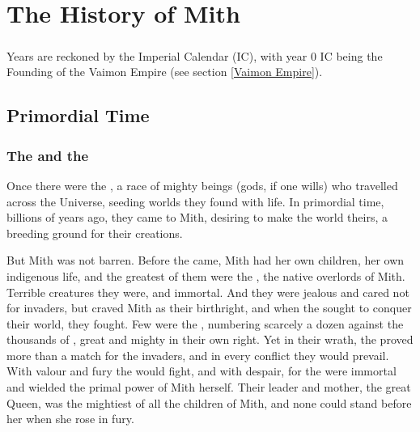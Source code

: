 \chapter{The History of Mith}




%







\paragraph{} Years are reckoned by the Imperial Calendar (IC), with year 0 IC being the Founding of the Vaimon Empire (see section \ref{Vaimon Empire}). 



\section{Primordial Time}
\subsection{The \voyagers{} and the \krakens{}}
\index{\krakens}
\label{Kraken}
\index{\voyagers}
\label{Voyagers}
Once there were the \voyagers, a race of mighty beings (gods, if one wills) who travelled across the Universe, seeding worlds they found with life. In primordial time, billions of years ago, they came to Mith, desiring to make the world theirs, a breeding ground for their creations. 

But Mith was not barren. Before the \voyagers{} came, Mith had her own children, her own indigenous life, and the greatest of them were the \krakens, the native overlords of Mith. Terrible creatures they were, and immortal. And they were jealous and cared not for invaders, but craved Mith as their birthright, and when the \voyagers{} sought to conquer their world, they fought. Few were the \krakens{}, numbering scarcely a dozen against the thousands of \voyagers{}, great and mighty in their own right. Yet in their wrath, the \krakens{} proved more than a match for the invaders, and in every conflict they would prevail. With valour and fury the \voyagers{} would fight, and with despair, for the \krakens{} were immortal and wielded the primal power of Mith herself. Their leader and mother, the great \Kraken{} Queen, was the mightiest of all the children of Mith, and none could stand before her when she rose in fury. 


